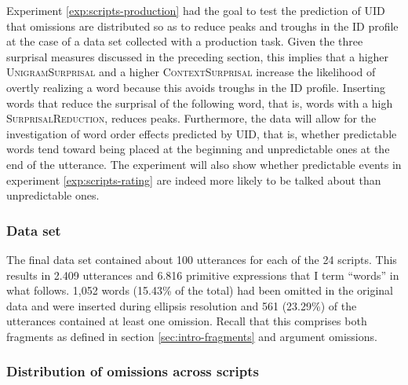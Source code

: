 Experiment \ref{exp:scripts-production} had the goal to test the prediction of UID that omissions are distributed so as to reduce peaks and troughs in the ID profile at the case of a data set collected with a production task. Given the three surprisal measures discussed in the preceding section, this implies that a higher \textsc{UnigramSurprisal} and a higher \textsc{ContextSurprisal} increase the likelihood of overtly realizing a word because this avoids troughs in the ID profile. Inserting words that reduce the surprisal of the following word, that is, words with a high \textsc{SurprisalReduction}, reduces peaks. Furthermore, the data will allow for the investigation of word order effects predicted by UID, that is, whether predictable words tend toward being placed at the beginning and unpredictable ones at the end of the utterance. The experiment will also show whether predictable events in experiment \ref{exp:scripts-rating} are indeed more likely to be talked about than unpredictable ones.


\subsubsection{Data set}
\label{sec:scripts-production-results-dataset}
The final data set contained about 100 utterances for each of the 24 scripts. This results in 2.409 utterances and 6.816 primitive expressions that I term ``words'' in what follows. 1,052 words (15.43\% of the total) had been omitted in the original data and were inserted during ellipsis resolution and 561 (23.29\%) of the utterances contained at least one omission. Recall that this comprises both fragments as defined in section \ref{sec:intro-fragments} and argument omissions.

\subsubsection{Distribution of omissions across scripts}

